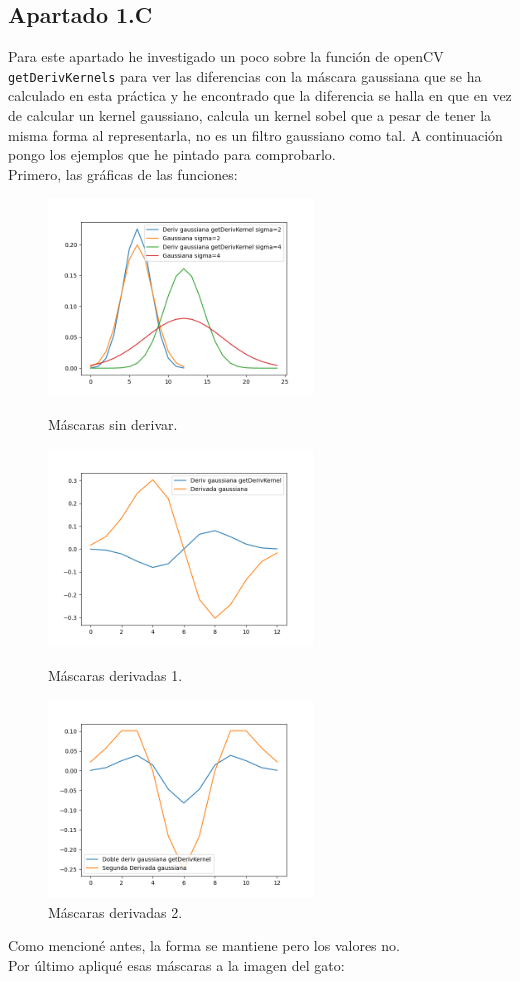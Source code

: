 \documentclass[12pt]{article}
\begin{document}
\subsection*{Apartado 1.C}
Para este apartado he investigado un poco sobre la función de openCV \texttt{getDerivKernels} para ver las diferencias con la máscara gaussiana que se ha calculado en esta práctica y he encontrado que la diferencia se halla en que en vez de calcular un kernel gaussiano, calcula un kernel sobel que a pesar de tener la misma forma al representarla, no es un filtro gaussiano como tal. A continuación pongo los ejemplos que he pintado para comprobarlo.\\
Primero, las gráficas de las funciones:
\begin{figure}[H]
\centering
\parbox{7cm}{
\includegraphics[width=7cm]{images/GaussianaGetDerivKernels.png}
\caption{Máscaras sin derivar.}
\label{fig:2figsA}}
\qquad
\begin{minipage}{7cm}
\includegraphics[width=7cm]{images/DerivGaussianaGetDerivKernels.png}
\caption{Máscaras derivadas 1.}
\label{fig:2figsB}
\end{minipage}
\qquad
\begin{minipage}{7cm}
\includegraphics[width=7cm]{images/DobleDerivGaussianaGetDerivKernels.png}
\caption{Máscaras derivadas 2.}
\label{fig:2figsB}
\end{minipage}
\end{figure}
Como mencioné antes, la forma se mantiene pero los valores no.\\
Por último apliqué esas máscaras a la imagen del gato:
\end{document}
